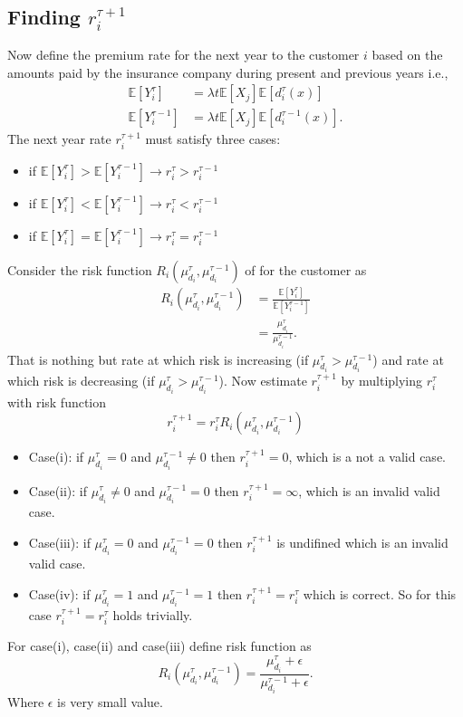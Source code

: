 \documentclass[a4paper,english,12pt]{article}
\begin{document}
\subsection{Finding $r_i^{\tau+1}$}
Now define the premium rate for the next year to the customer $i$ based on the amounts paid by the insurance company during present and previous years i.e.,
\begin{align}
\mathbb{E}[Y_i^\tau]&=\lambda t \mathbb{E}\left[X_j\right]\mathbb{E}\left[d_i^\tau(x)\right]\\
\mathbb{E}[Y_i^{\tau-1}]&=\lambda t \mathbb{E}\left[X_j\right]\mathbb{E}\left[d_i^{\tau-1}(x)\right].
\end{align}
The next year rate $r_i^{\tau+1}$ must satisfy three cases:
\begin{itemize}
\item if $\mathbb{E}[Y_i^\tau]>\mathbb{E}[Y_i^{\tau-1}] \rightarrow r_i^\tau> r_i^{\tau-1}$
\item if $\mathbb{E}[Y_i^\tau]<\mathbb{E}[Y_i^{\tau-1}] \rightarrow r_i^\tau< r_i^{\tau-1}$
\item if $\mathbb{E}[Y_i^\tau]=\mathbb{E}[Y_i^{\tau-1}] \rightarrow r_i^\tau=r_i^{\tau-1}$
\end{itemize}
Consider the risk function $R_i(\mu_{d_i}^\tau,\mu_{d_i}^{\tau-1})$ of for the customer as
\begin{align}
R_i(\mu_{d_i}^\tau,\mu_{d_i}^{\tau-1}) &= \frac{\mathbb{E}[Y_i^\tau]}{\mathbb{E}[Y_i^{\tau-1}]}\\
							   &=\frac{\mu_{d_i}^\tau}{\mu_{d_i}^{\tau-1}}.
\end{align}
That is nothing but rate at which risk is increasing (if $\mu_{d_i}^\tau >\mu_{d_i}^{\tau-1}$) and rate at which risk is decreasing (if $\mu_{d_i}^\tau >\mu_{d_i}^{\tau-1}$).
Now estimate $r_i^{\tau+1}$ by multiplying  $r_i^{\tau}$ with risk function
\begin{equation}
r_i^{\tau+1}=r_i^{\tau}R_i(\mu_{d_i}^\tau,\mu_{d_i}^{\tau-1})
\end{equation}
\begin{itemize}
\item Case(i): if $\mu_{d_i}^\tau = 0$ and $\mu_{d_i}^{\tau-1} \neq 0$ then $r_i^{\tau+1}=0$, which is a not a valid case.
\item Case(ii): if $\mu_{d_i}^\tau \neq 0$ and $\mu_{d_i}^{\tau-1} = 0$ then $r_i^{\tau+1}=\infty$, which is an invalid valid case.
\item Case(iii): if $\mu_{d_i}^\tau = 0$ and $\mu_{d_i}^{\tau-1} = 0$ then $r_i^{\tau+1}$ is undifined which is an invalid valid case.
\item Case(iv): if $\mu_{d_i}^\tau = 1$ and $\mu_{d_i}^{\tau-1} = 1$ then $r_i^{\tau+1}= r_i^\tau$ which is correct. So for this case $r_i^{\tau+1}= r_i^\tau$ holds trivially.
\end{itemize}
For case(i), case(ii) and case(iii) define risk function as
\begin{equation}
R_i(\mu_{d_i}^\tau,\mu_{d_i}^{\tau-1})=\frac{\mu_{d_i}^\tau+\epsilon}{\mu_{d_i}^{\tau-1}+\epsilon}.
\end{equation}
Where $\epsilon$ is very small value.
\end{document}
